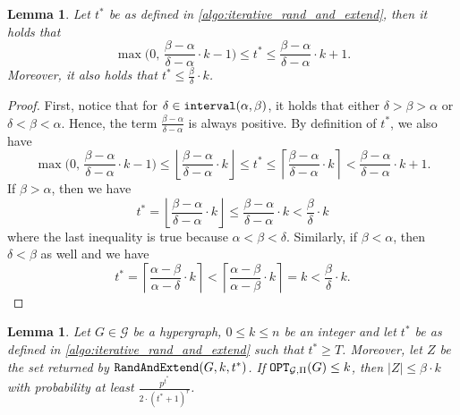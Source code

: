 \documentclass[letterpaper,11pt]{article}
\newcommand{\abs}[1]{{\left| #1\right|}}
\newcommand{\1}[1]{\mathds{1}\left[#1\right]}
\newcommand{\randext}{\textnormal{\texttt{RandAndExtend}}}
\newcommand{\OPT}{\textnormal{\texttt{OPT}}}
\newcommand{\goodd}{\textnormal{\texttt{interval}}(\alpha, \beta)}
\newtheorem{lemma}[theorem]{Lemma}
\newcommand{\cG}{\mathcal{G}}
\begin{document}
\begin{lemma}\label{lem:tstar_bound}
	Let $t^*$ be as defined in \cref{algo:iterative_rand_and_extend}, then it holds that
	\begin{equation*}
		\max\biggl(0,\,\frac{\beta - \alpha}{\delta - \alpha} \cdot k - 1\biggr) \leq t^* \leq \frac{\beta - \alpha}{\delta - \alpha}\cdot k + 1.
	\end{equation*}
	Moreover, it also holds that $t^* \leq \frac{\beta}{\delta} \cdot k$.
\end{lemma}

\begin{proof}
	First, notice that for $\delta \in \goodd$, it holds that either $\delta > \beta > \alpha$ or $\delta < \beta < \alpha$.
	Hence, the term $\frac{\beta - \alpha}{\delta - \alpha}$ is always positive. By definition of $t^*$, we also have
	\begin{equation*}
		   \max\biggl(0,\,\frac{\beta - \alpha}{\delta - \alpha} \cdot k - 1\biggr) \leq \left\lfloor   \frac{\beta - \alpha}{\delta  -\alpha}  \cdot k   \right\rfloor \leq t^* \leq \left\lceil  \frac{\beta - \alpha}{\delta  -\alpha}  \cdot k  \right\rceil <    \frac{\beta - \alpha}{\delta  -\alpha}  \cdot k  + 1.
	\end{equation*}
	If $\beta > \alpha$, then we have
	\begin{equation*}
		t^* = \left\lfloor    \frac{\beta - \alpha}{\delta  -\alpha}  \cdot k    \right\rfloor \leq  \frac{\beta - \alpha}{\delta  -\alpha}  \cdot k  < \frac{\beta}{\delta} \cdot k
	\end{equation*}
	where the last inequality is true because $\alpha < \beta < \delta$. Similarly,
	if $\beta < \alpha$, then $\delta < \beta$ as well and we have
	\begin{equation*}
		t^* = \left\lceil     \frac{\alpha - \beta}{\alpha - \delta}  \cdot k  \right\rceil < \left\lceil \frac{\alpha - \beta}{\alpha - \beta}  \cdot k \right\rceil = k < \frac{\beta}{\delta} \cdot k.
	\end{equation*}
\end{proof}

\begin{lemma}\label{lem:randext_exists}
	Let $G \in \mathcal{G}$ be a hypergraph, $0 \leq k \leq n$ be an integer and let $t^*$ be as defined in \cref{algo:iterative_rand_and_extend} such that $t^* \geq T$.
	Moreover, let $Z$ be the set returned by $\randext(G,k,t^*)$.
	If $\OPT_{\cG,\Pi}(G) \leq k$, then $\abs{Z} \leq \beta \cdot k$ with probability at least $\frac{p^{t^*}}{2 \cdot (t^* + 1)^{r}}$.
\end{lemma}
\end{document}
